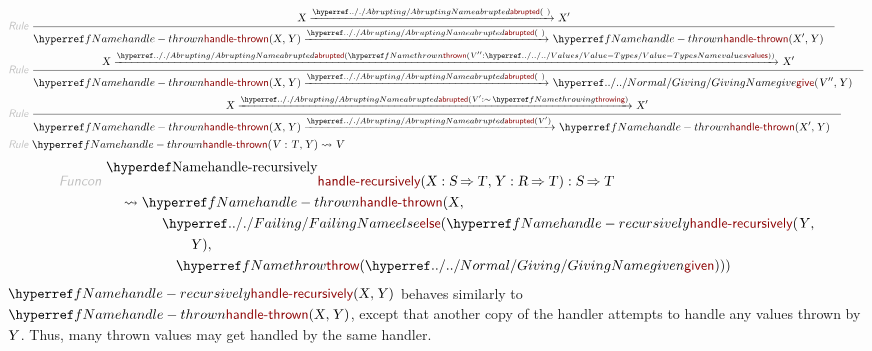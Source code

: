 \begin{align*}
  \KEY{Rule} ~ 
    & \RULE{
       \VAR{X} \xrightarrow{\NAMEHYPER{../.}{Abrupting}{abrupted}(  ~  )}_{} 
        \VAR{X}'
      }{
      &  \NAMEREF{handle-thrown}
                      ( \VAR{X},   
                        \VAR{Y} ) \xrightarrow{\NAMEHYPER{../.}{Abrupting}{abrupted}(  ~  )}_{} 
          \NAMEREF{handle-thrown}
            ( \VAR{X}',   
              \VAR{Y} )
      }
\\
  \KEY{Rule} ~ 
    & \RULE{
       \VAR{X} \xrightarrow{\NAMEHYPER{../.}{Abrupting}{abrupted}( \NAMEREF{thrown}
                                                                                                    ( \VAR{V}'' : \NAMEHYPER{../../../Values}{Value-Types}{values} ) )}_{} 
        \VAR{X}'
      }{
      &  \NAMEREF{handle-thrown}
                      ( \VAR{X},   
                        \VAR{Y} ) \xrightarrow{\NAMEHYPER{../.}{Abrupting}{abrupted}(  ~  )}_{} 
          \NAMEHYPER{../../Normal}{Giving}{give}
            ( \VAR{V}'',   
              \VAR{Y} )
      }
\\
  \KEY{Rule} ~ 
    & \RULE{
       \VAR{X} \xrightarrow{\NAMEHYPER{../.}{Abrupting}{abrupted}( \VAR{V}' : \mathop{\sim} \NAMEREF{throwing} )}_{} 
        \VAR{X}'
      }{
      &  \NAMEREF{handle-thrown}
                      ( \VAR{X},   
                        \VAR{Y} ) \xrightarrow{\NAMEHYPER{../.}{Abrupting}{abrupted}( \VAR{V}' )}_{} 
          \NAMEREF{handle-thrown}
            ( \VAR{X}',   
              \VAR{Y} )
      }
\\
  \KEY{Rule} ~ 
    & \NAMEREF{handle-thrown}
        ( \VAR{V} : \VAR{T},   
          \VAR{Y} ) \leadsto
        \VAR{V}
\end{align*}
\begin{align*}
  \KEY{Funcon} ~ 
  & \NAMEDECL{handle-recursively}(\VAR{X} : \VAR{S} \TO \VAR{T}, \VAR{Y} : \VAR{R} \TO \VAR{T}) : \VAR{S} \TO \VAR{T} \\
  & \quad \leadsto \NAMEREF{handle-thrown}
                     ( \VAR{X}, \\&\quad \quad \quad \quad 
                       \NAMEHYPER{../.}{Failing}{else}
                         ( \NAMEREF{handle-recursively}
                             ( \VAR{Y}, \\&\quad \quad \quad \quad \quad \quad 
                               \VAR{Y} ), \\&\quad \quad \quad \quad \quad 
                           \NAMEREF{throw}
                             ( \NAMEHYPER{../../Normal}{Giving}{given} ) ) )
\end{align*}
$\SHADE{\NAMEREF{handle-recursively}
           ( \VAR{X},   
             \VAR{Y} )}$ behaves similarly to $\SHADE{\NAMEREF{handle-thrown}
           ( \VAR{X},   
             \VAR{Y} )}$, except
  that another copy of the handler attempts to handle any values thrown by $\SHADE{\VAR{Y}}$.
  Thus, many thrown values may get handled by the same handler.

